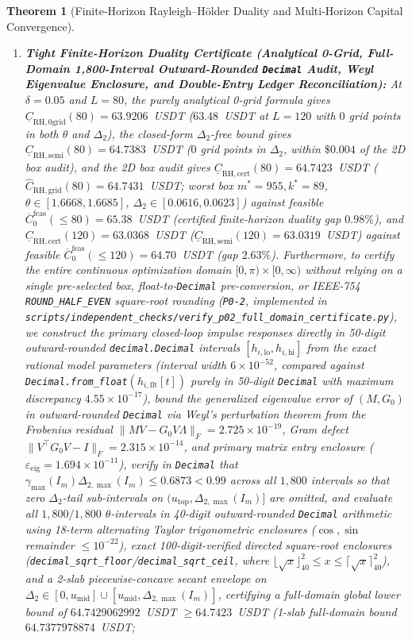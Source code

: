 \documentclass[12pt]{article}
\newtheorem{theorem}{Theorem}[section]
\theoremstyle{definition}
\theoremstyle{remark}
\begin{document}
\begin{theorem}[Finite-Horizon Rayleigh--H\"older Duality and Multi-Horizon Capital Convergence]
\begin{enumerate}
\item \textbf{Tight Finite-Horizon Duality Certificate (Analytical 0-Grid, Full-Domain 1,800-Interval Outward-Rounded \texttt{Decimal} Audit, Weyl Eigenvalue Enclosure, and Double-Entry Ledger Reconciliation):} At $\delta = 0.05$ and $L=80$, the purely analytical 0-grid formula gives $\underline{C}_{\mathrm{RH,0grid}}(80) = 63.9206$~USDT ($63.48$~USDT at $L=120$ with $0$ grid points in both $\theta$ and $\Delta_2$), the closed-form $\Delta_2$-free bound gives $\underline{C}_{\mathrm{RH,semi}}(80) = 64.7383$~USDT ($0$ grid points in $\Delta_2$, within $\$0.004$ of the 2D box audit), and the 2D box audit gives $\underline{C}_{\mathrm{RH,cert}}(80) = 64.7423$~USDT ($\hat{C}_{\mathrm{RH,grid}}(80) = 64.7431$~USDT; worst box $m^* = 955, k^* = 89$, $\theta \in [1.6668, 1.6685]$, $\Delta_2 \in [0.0616, 0.0623]$) against feasible $\overline{C}_0^{\mathrm{feas}}(\le 80) = 65.38$~USDT (certified finite-horizon duality gap $0.98\%$), and $\underline{C}_{\mathrm{RH,cert}}(120) = 63.0368$~USDT ($\underline{C}_{\mathrm{RH,semi}}(120) = 63.0319$~USDT) against feasible $\overline{C}_0^{\mathrm{feas}}(\le 120) = 64.70$~USDT (gap $2.63\%$). Furthermore, to certify the entire continuous optimization domain $[0, \pi) \times [0, \infty)$ without relying on a single pre-selected box, float-to-\texttt{Decimal} pre-conversion, or IEEE-754 \texttt{ROUND\_HALF\_EVEN} square-root rounding (\texttt{P0-2}, implemented in \nolinkurl{scripts/independent_checks/verify_p02_full_domain_certificate.py}), we construct the primary closed-loop impulse responses directly in 50-digit outward-rounded \texttt{decimal.Decimal} intervals $[h_{i,\mathrm{lo}}, h_{i,\mathrm{hi}}]$ from the exact rational model parameters (interval width $6 \times 10^{-52}$, compared against \texttt{Decimal.from\_float}$(h_{i,\mathrm{flt}}[t])$ purely in 50-digit \texttt{Decimal} with maximum discrepancy $4.55 \times 10^{-17}$), bound the generalized eigenvalue error of $(M, G_0)$ in outward-rounded \texttt{Decimal} via Weyl's perturbation theorem from the Frobenius residual $\|M V - G_0 V \Lambda\|_F = 2.725 \times 10^{-19}$, Gram defect $\|V^\top G_0 V - I\|_F = 2.315 \times 10^{-14}$, and primary matrix entry enclosure ($\varepsilon_{\mathrm{eig}} = 1.694 \times 10^{-11}$), verify in \texttt{Decimal} that $\gamma_{\max}(I_m)\Delta_{2,\max}(I_m) \le 0.6873 < 0.99$ across all $1{,}800$ intervals so that zero $\Delta_2$-tail sub-intervals on $(u_{\mathrm{top}}, \Delta_{2,\max}(I_m)]$ are omitted, and evaluate all $1{,}800 / 1{,}800$ $\theta$-intervals in 40-digit outward-rounded \texttt{Decimal} arithmetic using 18-term alternating Taylor trigonometric enclosures ($\cos, \sin$ remainder $\le 10^{-22}$), exact 100-digit-verified directed square-root enclosures (\texttt{decimal\_sqrt\_floor}/\texttt{decimal\_sqrt\_ceil}, where $\lfloor\sqrt{x}\rfloor_{40}^2 \le x \le \lceil\sqrt{x}\rceil_{40}^2$), and a 2-slab piecewise-concave secant envelope on $\Delta_2 \in [0, u_{\mathrm{mid}}] \cup [u_{\mathrm{mid}}, \Delta_{2,\max}(I_m)]$, certifying a full-domain global lower bound of $64.7429062992$~USDT $\ge 64.7423$~USDT (1-slab full-domain bound $64.7377978874$~USDT; 
\end{enumerate}
\end{theorem}
\end{document}
